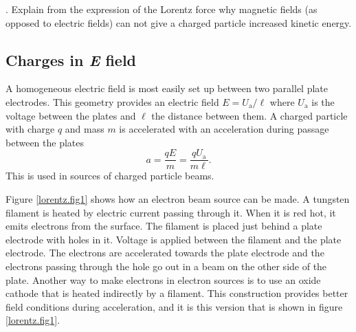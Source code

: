 \documentclass[../Elmag-labhefte-2020.tex]{subfiles}
\begin{document}
{. Explain from the expression of the Lorentz force why magnetic fields (as opposed to electric fields) can not give a charged particle increased kinetic energy.}

\subsection{Charges in \textsl{E} field}

A homogeneous electric field is most easily set up between two parallel plate electrodes. This geometry provides an electric field $E = U_\mathrm{a}/\ell$ where $U_\mathrm{a}$ is the voltage between the plates and $\ell$ the distance between them. A charged particle with charge $q$ and mass $m$ is accelerated with an acceleration during passage between the plates
\begin{equation}
    a = \frac{q E}{m} = \frac{q U_\mathrm{a}}{m\ell}.
    \label{eq:lorentz.aksel}
\end{equation}
%
This is used in sources of charged particle beams.

Figure \ref{lorentz.fig1} shows how an electron beam source can be made. A tungsten filament is heated by electric current passing through it. When it is red hot, it emits electrons from the surface. The filament is placed just behind a plate electrode with holes in it. Voltage is applied between the filament and the plate electrode. The electrons are accelerated towards the plate electrode and the electrons passing through the hole go out in a beam on the other side of the plate. Another way to make electrons in electron sources is to use an oxide cathode that is heated indirectly by a filament. This construction provides better field conditions during acceleration, and it is this version that is shown in figure \ref{lorentz.fig1}.
%
\end{document}

